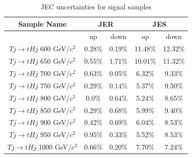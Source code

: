 \begin{table}[htbH]
\begin{center}
\begin{tabular}{|c|c|c|c|c|}
\hline 
Sample Name & \multicolumn{2}{c|}{JER} & \multicolumn{2}{c|}{JES} \\
\hline
 & up & down & up & down \\
\hline
$Tj\rightarrow tHj$ 600 GeV/$c^{2}$ & 0.28\% & 0.19\% & 11.48\% & 12.32\% \\
$Tj\rightarrow tHj$ 650 GeV/$c^{2}$ & 0.55\% & 1.71\% & 10.01\% & 11.32\% \\
$Tj\rightarrow tHj$ 700 GeV/$c^{2}$ & 0.63\% & 0.05\% & 6.32\% & 9.33\% \\
$Tj\rightarrow tHj$ 750 GeV/$c^{2}$ & 0.29\% & 0.14\% & 5.37\% & 9.50\% \\
$Tj\rightarrow tHj$ 800 GeV/$c^{2}$ & 0.0\% & 0.64\% & 5.24\% & 8.65\% \\
$Tj\rightarrow tHj$ 850 GeV/$c^{2}$ & 0.29\% & 0.68\% & 5.99\% & 9.40\% \\
$Tj\rightarrow tHj$ 900 GeV/$c^{2}$ & 0.42\% & 0.69\% & 6.04\% & 8.53\% \\
$Tj\rightarrow tHj$ 950 GeV/$c^{2}$ & 0.95\% & 0.33\% & 5.52\% & 8.53\% \\
$Tj\rightarrow tHj$ 1000 GeV/$c^{2}$ & 0.66\% & 0.20\% & 7.70\% & 7.24\% \\
\hline
\end{tabular}
\caption{JEC uncertainties for signal samples\label{tab:JECSys}}
\end{center}
\end{table}\clearpage

